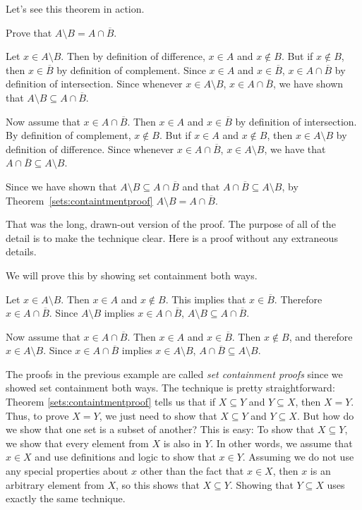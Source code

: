 Let's see this theorem in action.

\begin{exa}\label{setpf1}
Prove that $A\setminus B=A\cap\overline{B}$.
\begin{pf}
Let $x\in A\setminus B$.  Then by definition of difference, 
$x\in A$ and $x\not\in B$.  
But if $x\not\in B$, then $x\in\overline{B}$ by definition of complement.
Since $x\in A$ and $x\in \overline{B}$, $x\in A\cap\overline{B}$ by 
definition of intersection.  Since whenever $x \in A\setminus B$, $x\in A\cap\overline{B}$,
we have shown that  $A\setminus B\subseteq A\cap\overline{B}$.

Now assume that $x\in A\cap\overline{B}$.  Then $x\in A$ and $x\in \overline{B}$ by
definition of intersection.  By definition of complement, $x\not\in B$.
But if $x\in A$ and $x\not\in B$, then $x\in A\setminus B$ by definition of
difference.  Since whenever $x\in A\cap\overline{B}$, $x\in A\setminus B$,
we have that  $A\cap\overline{B}\subseteq A\setminus B$.

Since we have shown that $A\setminus B\subseteq A\cap\overline{B}$ and that
$A\cap\overline{B}\subseteq A\setminus B$, by Theorem~\ref{sets:containtmentproof}
$A\setminus B=A\cap\overline{B}$.
\end{pf}

That was the long, drawn-out version of the proof.  The purpose of all of the
detail is to make the technique clear.  Here is a proof without any
extraneous details.
\begin{pf}
We will prove this by showing set containment both ways.

Let $x\in A\setminus B$.
Then $x\in A$ and $x\not\in B$.  This implies that $x\in\overline{B}$.
Therefore $x\in A\cap\overline{B}$.  
Since $A\setminus B$ implies $x\in A\cap\overline{B}$,
$A\setminus B\subseteq A\cap\overline{B}$.

Now assume that $x\in A\cap\overline{B}$.  Then $x\in A$ and $x\in \overline{B}$.  
Then $x\not\in B$, and therefore $x\in A\setminus B$.
Since $x\in A\cap\overline{B}$ implies $x\in A\setminus B$,
$A\cap\overline{B}\subseteq A\setminus B$.
\end{pf}
\end{exa}


The proofs in the previous example are called {\em set containment proofs} since we showed set containment both ways.  
The technique is pretty straightforward:  
Theorem \ref{sets:containtmentproof} tells us that if $X\subseteq Y$ and $ Y\subseteq X$, then
$X=Y$.  Thus, to prove $X=Y$, we just need to show that  $X\subseteq Y$ and $ Y\subseteq X$.
But how do we show that one set is a subset of another? 
This is easy: To show that $X\subseteq Y$, we show that every element from $X$ is also in $Y$.  
In other words, we assume that $x\in X$ and use definitions and logic to show that $x\in Y$.
Assuming we do not use any special properties about $x$ other than the fact that $x\in X$, 
then $x$ is an arbitrary element from $X$, so this shows that $X\subseteq Y$.
Showing that $Y\subseteq X$ uses exactly the same technique.

